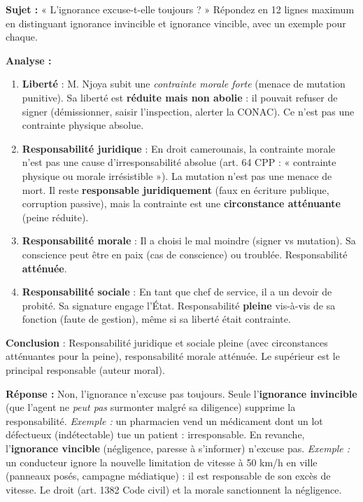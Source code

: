 \documentclass[11pt]{article}
\begin{document}
\begin{exercice}
\textbf{Sujet :} « L'ignorance excuse-t-elle toujours ? » Répondez en 12 lignes maximum en distinguant ignorance invincible et ignorance vincible, avec un exemple pour chaque.
\end{exercice}

\begin{corrige}
\textbf{Analyse :}
\begin{enumerate}
\item \textbf{Liberté} : M. Njoya subit une \emph{contrainte morale forte} (menace de mutation punitive). Sa liberté est \textbf{réduite mais non abolie} : il pouvait refuser de signer (démissionner, saisir l'inspection, alerter la CONAC). Ce n'est pas une contrainte physique absolue.
\item \textbf{Responsabilité juridique} : En droit camerounais, la contrainte morale n'est pas une cause d'irresponsabilité absolue (art. 64 CPP : « contrainte physique ou morale irrésistible »). La mutation n'est pas une menace de mort. Il reste \textbf{responsable juridiquement} (faux en écriture publique, corruption passive), mais la contrainte est une \textbf{circonstance atténuante} (peine réduite).
\item \textbf{Responsabilité morale} : Il a choisi le mal moindre (signer vs mutation). Sa conscience peut être en paix (cas de conscience) ou troublée. Responsabilité \textbf{atténuée}.
\item \textbf{Responsabilité sociale} : En tant que chef de service, il a un devoir de probité. Sa signature engage l'État. Responsabilité \textbf{pleine} vis-à-vis de sa fonction (faute de gestion), même si sa liberté était contrainte.
\end{enumerate}
\textbf{Conclusion} : Responsabilité juridique et sociale pleine (avec circonstances atténuantes pour la peine), responsabilité morale atténuée. Le supérieur est le principal responsable (auteur moral).
\end{corrige}

\begin{corrige}
\textbf{Réponse :} Non, l'ignorance n'excuse pas toujours. Seule l'\textbf{ignorance invincible} (que l'agent ne \emph{peut pas} surmonter malgré sa diligence) supprime la responsabilité. \emph{Exemple :} un pharmacien vend un médicament dont un lot défectueux (indétectable) tue un patient : irresponsable. En revanche, l'\textbf{ignorance vincible} (négligence, paresse à s'informer) n'excuse pas. \emph{Exemple :} un conducteur ignore la nouvelle limitation de vitesse à 50 km/h en ville (panneaux posés, campagne médiatique) : il est responsable de son excès de vitesse. Le droit (art. 1382 Code civil) et la morale sanctionnent la négligence.
\end{corrige}
\end{document}
